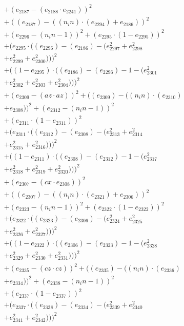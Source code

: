 \documentclass[10pt, a4paper]{article}
\begin{document}
\begin{align*}
& + (e_{2187} - (e_{2188}  \cdot  e_{2241}))^{2} \\
& + ((e_{2187}) - ((n_in)  \cdot  (e_{2294}) + e_{2186}))^{2} \\
& + (e_{2296} - (n_in - 1))^{2} + (e_{2295}  \cdot  (1 - e_{2295}))^{2} \\
& + (e_{2295}  \cdot  ((e_{2296}) - (e_{2186}) - (e_{2297}^{2} + e_{2298}^{2} \\
& + e_{2299}^{2} + e_{2300}^{2})))^{2} \\
& + ((1 - e_{2295})  \cdot  ((e_{2186}) - (e_{2296}) - 1 - (e_{2301}^{2} \\
& + e_{2302}^{2} + e_{2303}^{2} + e_{2304}^{2})))^{2} \\
& + (e_{2309} - (az  \cdot  az))^{2} + ((e_{2309}) - ((n_in)  \cdot  (e_{2310}) \\
& + e_{2308}))^{2} + (e_{2312} - (n_in - 1))^{2} \\
& + (e_{2311}  \cdot  (1 - e_{2311}))^{2} \\
& + (e_{2311}  \cdot  ((e_{2312}) - (e_{2308}) - (e_{2313}^{2} + e_{2314}^{2} \\
& + e_{2315}^{2} + e_{2316}^{2})))^{2} \\
& + ((1 - e_{2311})  \cdot  ((e_{2308}) - (e_{2312}) - 1 - (e_{2317}^{2} \\
& + e_{2318}^{2} + e_{2319}^{2} + e_{2320}^{2})))^{2} \\
& + (e_{2307} - (cx  \cdot  e_{2308}))^{2} \\
& + ((e_{2307}) - ((n_in)  \cdot  (e_{2321}) + e_{2306}))^{2} \\
& + (e_{2323} - (n_in - 1))^{2} + (e_{2322}  \cdot  (1 - e_{2322}))^{2} \\
& + (e_{2322}  \cdot  ((e_{2323}) - (e_{2306}) - (e_{2324}^{2} + e_{2325}^{2} \\
& + e_{2326}^{2} + e_{2327}^{2})))^{2} \\
& + ((1 - e_{2322})  \cdot  ((e_{2306}) - (e_{2323}) - 1 - (e_{2328}^{2} \\
& + e_{2329}^{2} + e_{2330}^{2} + e_{2331}^{2})))^{2} \\
& + (e_{2335} - (cz  \cdot  cz))^{2} + ((e_{2335}) - ((n_in)  \cdot  (e_{2336}) \\
& + e_{2334}))^{2} + (e_{2338} - (n_in - 1))^{2} \\
& + (e_{2337}  \cdot  (1 - e_{2337}))^{2} \\
& + (e_{2337}  \cdot  ((e_{2338}) - (e_{2334}) - (e_{2339}^{2} + e_{2340}^{2} \\
& + e_{2341}^{2} + e_{2342}^{2})))^{2} \\

\end{align*}
\end{document}
